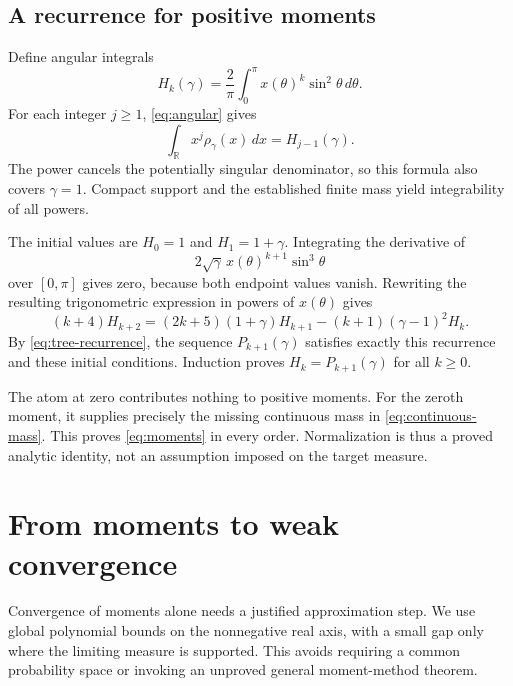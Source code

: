 \documentclass[11pt]{article}
\theoremstyle{remark}
\newcommand{\R}{\mathbb R}
\begin{document}
\subsection{A recurrence for positive moments}
Define angular integrals
\[
 H_k(\gamma)=\frac2\pi\int_0^\pi x(\theta)^k\sin^2\theta\,d\theta.
\]
For each integer $j\geq1$, \eqref{eq:angular} gives
\begin{equation}\label{eq:positive-moment}
 \int_\R x^j\rho_\gamma(x)\,dx=H_{j-1}(\gamma).
\end{equation}
The power cancels the potentially singular denominator, so this formula also covers $\gamma=1$. Compact support and the established finite mass yield integrability of all powers.

The initial values are $H_0=1$ and $H_1=1+\gamma$. Integrating the derivative of
\[
 2\sqrt\gamma\,x(\theta)^{k+1}\sin^3\theta
\]
over $[0,\pi]$ gives zero, because both endpoint values vanish. Rewriting the resulting trigonometric expression in powers of $x(\theta)$ gives
\begin{equation}\label{eq:angular-recurrence}
 (k+4)H_{k+2}=(2k+5)(1+\gamma)H_{k+1}
 -(k+1)(\gamma-1)^2H_k.
\end{equation}
By \eqref{eq:tree-recurrence}, the sequence $P_{k+1}(\gamma)$ satisfies exactly this recurrence and these initial conditions. Induction proves $H_k=P_{k+1}(\gamma)$ for all $k\geq0$.

The atom at zero contributes nothing to positive moments. For the zeroth moment, it supplies precisely the missing continuous mass in \eqref{eq:continuous-mass}. This proves \eqref{eq:moments} in every order. Normalization is thus a proved analytic identity, not an assumption imposed on the target measure.

\section{From moments to weak convergence}
Convergence of moments alone needs a justified approximation step. We use global polynomial bounds on the nonnegative real axis, with a small gap only where the limiting measure is supported. This avoids requiring a common probability space or invoking an unproved general moment-method theorem.
\end{document}
